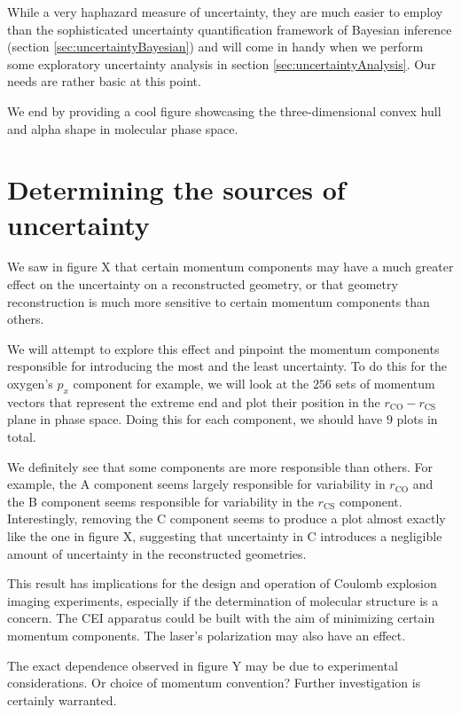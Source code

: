 While a very haphazard measure of uncertainty, they are much easier to employ than the sophisticated uncertainty quantification framework of Bayesian inference (section \ref{sec:uncertaintyBayesian}) and will come in handy when we perform some exploratory uncertainty analysis in section \ref{sec:uncertaintyAnalysis}. Our needs are rather basic at this point.

We end by providing a cool figure showcasing the three-dimensional convex hull and alpha shape in molecular phase space.


\section{Determining the sources of uncertainty}
We saw in figure X that certain momentum components may have a much greater effect on the uncertainty on a reconstructed geometry, or that geometry reconstruction is much more sensitive to certain momentum components than others.

We will attempt to explore this effect and pinpoint the momentum components responsible for introducing the most and the least uncertainty. To do this for the oxygen's $p_x$ component for example, we will look at the $256$ sets of momentum vectors that represent the extreme end and plot their position in the $r_\mathrm{CO}-r_\mathrm{CS}$ plane in phase space. Doing this for each component, we should have $9$ plots in total.


We definitely see that some components are more responsible than others. For example, the A component seems largely responsible for variability in $r_\mathrm{CO}$ and the B component seems responsible for variability in the $r_\mathrm{CS}$ component. Interestingly, removing the C component seems to produce a plot almost exactly like the one in figure X, suggesting that uncertainty in C introduces a negligible amount of uncertainty in the reconstructed geometries.

This result has implications for the design and operation of Coulomb explosion imaging experiments, especially if the determination of molecular structure is a concern. The CEI apparatus could be built with the aim of minimizing certain momentum components. The laser's polarization may also have an effect.

The exact dependence observed in figure Y may be due to experimental considerations. Or choice of momentum convention? Further investigation is certainly warranted.

